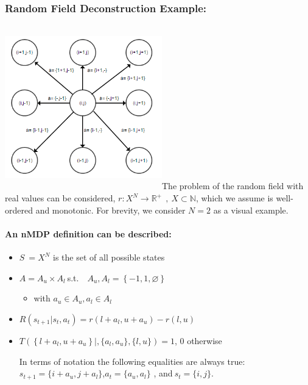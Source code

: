 \documentclass[]{article}
\let\oldparagraph\paragraph
\renewcommand{\paragraph}[1]{\oldparagraph{#1}\mbox{}}
\begin{document}
\subsubsection{Random Field Deconstruction
Example:}\label{random-field-deconstruction-example}

\includegraphics[width=2.68750in,height=2.80556in]{media/image1.png}The
problem of the random field with real values can be considered,
\(r:X^{N} \rightarrow \mathbb{R}^{+}\ \ ,\ X\mathbb{\subset N}\), which
we assume is well-ordered and monotonic. For brevity, we consider
\(N = 2\) as a visual example.

\paragraph{An nMDP definition can be
described:}\label{an-nmdp-definition-can-be-described}

\begin{itemize}
\item
  \(S\  = X^{N}\) is the set of all possible states
\item
  \(A = A_{u} \times A_{l}\ \)s.t.
  \(\text{\ \ }A_{u},A_{l} = \left\{ - 1,1,\varnothing \right\}\)

  \begin{itemize}
  \item
    with \(a_{u} \in A_{u},a_{l} \in A_{l}\)
  \end{itemize}
\item
  \(R\left( s_{t + 1}|s_{t},a_{t} \right) = r\left( l + a_{l},u + a_{u} \right) - r(l,u)\)
\item
  \(T\left( \left\{ l + a_{l},u + a_{u} \right\}|,\{ a_{l},a_{u}\},\{ l,u\} \right) = 1\),
  \(0\) otherwise

  In terms of notation the following equalities are always true:
  \(s_{t + 1} = \{ i + a_{u},j + a_{l}\}\),\(a_{t} = \{ a_{u},a_{l}\}\)
  , and\(\ s_{t} = \{ i,j\}\).
\end{itemize}
\end{document}

